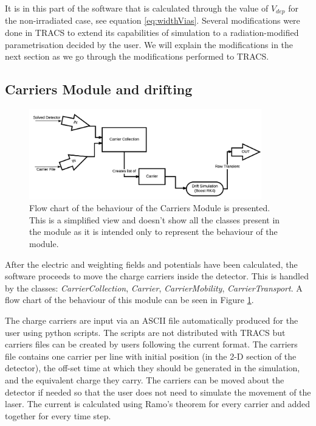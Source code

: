 It is in this part of the software that \neff is calculated through the value of $V_{dep}$ for the non-irradiated case, see equation \ref{eq:widthVias}. Several modifications were done in TRACS to extend its capabilities of simulation to a radiation-modified \neff parametrisation decided by the user. We will explain the modifications in the next section as we go through the modifications performed to TRACS.


\subsection{Carriers Module and drifting}

\begin{figure}[H]
	\includegraphics[width=0.9\textwidth]{Carriers_Module.png}
	\caption{Flow chart of the behaviour of the Carriers Module is presented. This is a simplified view and doesn't show all the classes present in the module as it is intended only to represent the behaviour of the module.}
	\label{fig:CarrierFc}
\end{figure}

After the electric and weighting fields and potentials have been calculated, the software proceeds to move the charge carriers inside the detector. This is handled by the classes: \textit{CarrierCollection}, \textit{Carrier}, \textit{CarrierMobility}, \textit{CarrierTransport}. A flow chart of the behaviour of this module can be seen in Figure \ref{fig:CarrierFc}.

The charge carriers are input via an ASCII file automatically produced for the user using python scripts. The scripts are not distributed with TRACS but carriers files can be created by users following the current format. The carriers file contains one carrier per line with initial position (in the 2-D section of the detector), the off-set time at which they should be generated in the simulation, and the equivalent charge they carry. The carriers can be moved about the detector if needed so that the user does not need to simulate the movement of the laser. The current is calculated using Ramo's theorem for every carrier and added together for every time step.

